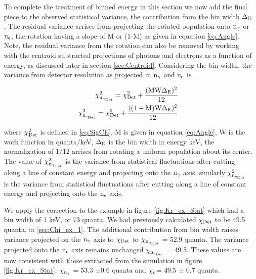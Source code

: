 To complete the treatment of binned energy in this section we now add the final piece to the observed statistical variance, the contribution from the bin width $\rm \Delta_E$. The residual variance arrises from projecting the rotated population onto $\rm n_\gamma$ or $\rm n_e$, the rotation having a slope of M or (1-M) as given in equation \ref{eq:Angle}. Note, the residual variance from the rotation can also be removed by working with the centroid subtracted projections of photons and electrons as a function of energy, as discussed later in section \ref{sec:Centroid}. Considering the bin width, the variance from detector resolution as projected in $\rm n_\gamma$ and $\rm n_e$ is 

\begin{equation}
\begin{split}
\rm \chi_{n_{\gamma_{Det}}}^2= \chi_{Det}^2 + \frac{(MW\Delta_E)^2}{12}\\
\rm \chi_{n_{e_{Det}}}^2= \chi_{Det}^2 + \frac{((1-M)W\Delta_E)^2}{12}\\
\label{eq:SigCE_2}
\end{split}
\end{equation}

\noindent where $\rm \chi_{Det}^2$ is defined in \ref{eq:SigCE}, M is given in equation \ref{eq:Angle}, W is the work function in quanta/keV, $\rm \Delta_E$ is the bin width in energy keV, the normalization of 1/12 arrises from rotating a uniform population about its center. The value of $\rm \chi_{n_{\gamma_{Det}}}^2$ is the variance from statistical fluctuations after cutting along a line of constant energy and projecting onto the $\rm n_\gamma$ axis, similarly $\rm \chi_{n_{e_{Det}}}^2$ is the variance from statistical fluctuations after cutting along a line of constant energy and projecting onto the $\rm n_e$ axis. 

We apply the correction to the example in figure \ref{fig:Kr_ex_Stat} which had a bin width of 1 keV, or 73 quanta. We had previously calculated $\rm \chi_{Det}$ to be 49.5 quanta, in \ref{sec:Chi_ex_1}. The additional contribution from bin width raises variance projected on the $\rm n_\gamma$ axis to $\rm \chi_{Det}$ to $\rm \chi_{n_{\gamma_{Det}}}$ = 52.9 quanta. The variance projected onto the $\rm n_e$ axis remains unchanged $\rm \chi_{n_{e_{Det}}}$ = 49.5. These values are now consistent with those extracted from the simulation in figure \ref{fig:Kr_ex_Stat}, $\rm \chi_{n_\gamma}$ = 53.3 $\pm$0.6 quanta and $\rm \chi_e$= 49.5 $\pm$ 0.7 quanta. 


